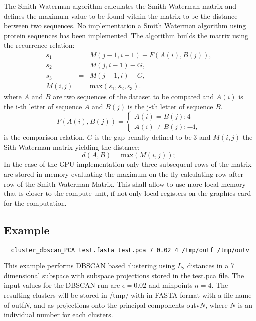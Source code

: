 The Smith Waterman algorithm calculates the Smith Waterman matrix and
defines the maximum value to be found within the matrix to be the
distance between two sequences. No implementation a Smith Waterman
algorithm using protein sequences has been implemented. The algorithm
builds the matrix using the recurrence relation:
\begin{eqnarray}
s_1&=&M(j-1,i-1)+F(A(i),B(j)), \\ \nonumber
s_2&=&M(j,i-1)-G, \\ \nonumber
s_3&=&M(j-1,i)-G, \\ \nonumber
M(i,j)&=&\mathrm{max}(s_1,s_2,s_3).
\end{eqnarray}
where $A$ and $B$ are two sequences of the dataset to be compared and
$A(i)$ is the i-th letter of sequence $A$ and $B(j)$ is the j-th
letter of sequence $B$.
\begin{equation}
  F(A(i),B(j)) = \left\{
    \begin{array}{l}
      A(i) = B(j) : 4 \\
      A(i) \neq B(j) : -4,
    \end{array} \right.
\end{equation}
is the comparison relation. $G$ is the gap penalty defined to be 3 and
$M(i,j)$ the Sith Waterman matrix yielding the distance:
\begin{equation}
  d(A,B) = \mathrm{max}(M(i,j));
\end{equation}
In the case of the GPU implementation only three subsequent rows of
the matrix are stored in memory evaluating the maximum on the fly
calculating row after row of the Smith Waterman Matrix. This shall
allow to use more local memory that is closer to the compute unit, if
not only local registers on the graphics card for the computation.

\subsection{Example}

\begin{lstlisting}
  cluster_dbscan_PCA test.fasta test.pca 7 0.02 4 /tmp/outf /tmp/outv
\end{lstlisting}
This example performs DBSCAN based clustering using $L_2$ distances in
a 7 dimensional subspace with subspace projections stored in the
test.pca file. The input values for the DBSCAN run are $\epsilon=0.02$
and minpoints $n=4$. The resulting clusters will be stored in /tmp/
with in FASTA format with a file name of outf$N$, and as projections
onto the principal components outv$N$, where $N$ is an individual
number for each clusters. 

